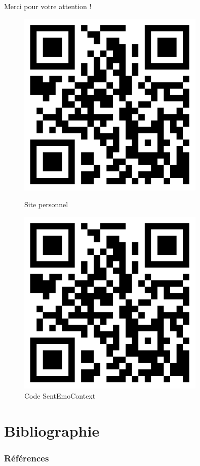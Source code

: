 \documentclass[11pt,aspectratio=169]{beamer}
\begin{document}
\begin{frame}[plain]
    \begin{center}
        {\color{deepblue}\Huge Merci pour votre attention !}
        
        \vspace{0.5cm}
        
        \begin{figure}[h]
            \centering
            \begin{minipage}{0.45\textwidth}
                \centering
                \includegraphics[width=0.8\textwidth]{qrcode.jpg}
                \caption{Site personnel}
            \end{minipage}
            \hspace{0.05\textwidth}
            \begin{minipage}{0.45\textwidth}
                \centering
                \includegraphics[width=0.8\textwidth]{qrcode.jpg}
                \caption{Code SentEmoContext}
            \end{minipage}
        \end{figure}
    \end{center}
\end{frame}

\section{Bibliographie}

\begin{frame}[t,allowframebreaks]
\frametitle{Références}
\printbibliography
\end{frame}
\end{document}
